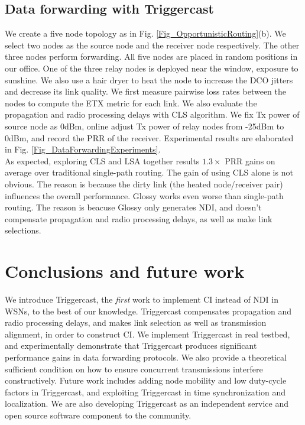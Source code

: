 \documentclass[conference]{IEEEtran}
\begin{document}
\subsection{Data forwarding with Triggercast}
\indent We create a five node topology as in Fig. \ref{Fig_OpportunisticRouting}(b).
We select two nodes as the source node and the receiver node respectively.
The other three nodes perform forwarding.
All five nodes are placed in random positions in our office.
One of the three relay nodes is deployed near the window, exposure to sunshine.
We also use a hair dryer to heat the node to increase the DCO jitters and decrease its link quality.
We first measure pairwise loss rates between the nodes to compute the ETX metric for each link.
We also evaluate the propagation and radio processing delays with CLS algorithm.
We fix Tx power of source node as 0dBm, online adjust Tx power of relay nodes from -25dBm to 0dBm, and record the PRR of the receiver.
Experimental results are elaborated in Fig. \ref{Fig_DataForwardingExperiments}.\\
\indent As expected, exploring CLS and LSA together results $1.3\times$ PRR gains on average over traditional single-path routing.
The gain of using CLS alone is not obvious.
The reason is because the dirty link (the heated node/receiver pair) influences the overall performance.
Glossy works even worse than single-path routing. The reason is beacuse Glossy only generates NDI, and doesn't compensate propagation and radio processing delays, as well as make link selections.
\section{Conclusions and future work}
\label{Sec_Conclusion}
\indent We introduce Triggercast, the \emph{first} work to implement CI instead of NDI in WSNs, to the best of our knowledge.
Triggercast compensates propagation and radio processing delays, and makes link selection as well as transmission alignment, in order to construct CI.
We implement Triggercast in real testbed, and experimentally demonstrate that Triggercast produces significant performance gains in data forwarding protocols.
We also provide a theoretical sufficient condition on how to ensure concurrent transmissions interfere constructively.
Future work includes adding node mobility and low duty-cycle factors in Triggercast, and exploiting Triggercast in time synchronization and localization.
We are also developing Triggercast as an independent service and open source software component to the community.





\ifCLASSOPTIONcaptionsoff
  \newpage
\fi







 
\end{document}
